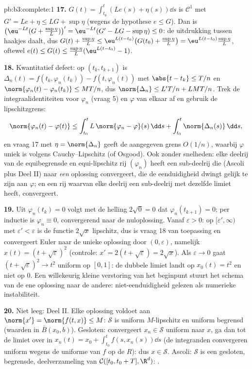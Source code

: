 \begin{solution}{pb:b3:complete:1}
\textbf{17.} $G(t) = \int_{t_0}^t(Le(s) + \eta(s))\dd s$ is
$\mathcal C^1$ met $G' = Le + \eta \leq LG + \sup\eta$ (wegens de
hypothese $e \leq G$). Dan is $\bigl(\eu^{-Lt}(G +
\tfrac{\sup\eta}L)\bigr)' = \eu^{-Lt}(G' - LG - \sup\eta) \leq 0$:
de uitdrukking tussen haakjes daalt, dus $G(t) + \frac{\sup\eta}L
\leq \eu^{L(t - t_0)}\bigl(G(t_0) + \frac{\sup\eta}L\bigr) =
\eu^{L(t-t_0)}\frac{\sup\eta}L$, oftewel $e(t) \leq G(t) \leq
\frac{\sup\eta}L(\eu^{L(t-t_0)} - 1)$.

\textbf{18.} Kwantitatief defect: op $(t_k, t_{k+1})$ is
$\Delta_n(t) = f(t_k, \varphi_n(t_k)) - f(t, \varphi_n(t))$ met
$\abs{t - t_k} \leq T/n$ en $\norm{\varphi_n(t) -
\varphi_n(t_k)} \leq MT/n$, dus $\norm{\Delta_n} \leq L'T/n +
LMT/n$. Trek de integraalidentiteiten voor $\varphi_n$ (vraag 5)
en $\varphi$ van elkaar af en gebruik de lipschitzgrens:
\[
\norm{\varphi_n(t) - \varphi(t)} \leq
\int_{t_0}^t L\,\norm{\varphi_n - \varphi}(s)\,\dd s +
\int_{t_0}^t\norm{\Delta_n(s)}\,\dd s,
\]
en vraag 17 met $\eta = \norm{\Delta_n}$ geeft de aangegeven
grens $O(1/n)$, waarbij $\varphi$ uniek is volgens
Cauchy--Lipschitz (of Osgood). Ook zonder snelheden: elke deelrij
van de equibegrensde en equi-lipschitz rij $(\varphi_n)$ heeft een
sub-deelrij die (Ascoli plus Deel II) naar \emph{een} oplossing
convergeert, die de eenduidigheid dwingt gelijk te zijn aan
$\varphi$; en een rij waarvan elke deelrij een sub-deelrij met
dezelfde limiet heeft, convergeert.

\textbf{19.} Uit $\varphi_n(t_k) = 0$ volgt met de helling
$2\sqrt0 = 0$ dat $\varphi_n(t_{k+1}) = 0$; per inductie is
$\varphi_n \equiv 0$, convergerend naar de nuloplossing. Vanaf
$\varepsilon > 0$: op $[\varepsilon', \infty)$ met $\varepsilon' <
\varepsilon$ is de functie $2\sqrt x$ lipschitz, dus is vraag 18
van toepassing en convergeert Euler naar de unieke oplossing door
$(0, \varepsilon)$, namelijk $x(t) = (t + \sqrt\varepsilon)^2$
(controle: $x' = 2(t + \sqrt \varepsilon) = 2\sqrt x$). Als
$\varepsilon \to 0$ gaat $(t + \sqrt\varepsilon)^2 \to t^2$
uniform op $[0,1]$: de dubbele limiet landt op $x_0(t) = t^2$ en
niet op $0$. Een willekeurig kleine verstoring van het beginpunt
stuurt het schema van de ene oplossing naar de andere:
niet-eenduidigheid gelezen als numerieke instabiliteit.

\textbf{20.} Niet leeg: Deel II. Elke oplossing voldoet aan
$\norm{x'} = \norm{f(t, x)} \leq M$: $\mathcal S$ is uniform
$M$-lipschitz en uniform begrensd (waarden in $\bar B(x_0, b)$).
Gesloten: convergeert $x_n \in \mathcal S$ uniform naar $x$, ga
dan tot de limiet over in $x_n(t) = x_0 + \int_{t_0}^tf(s,
x_n(s))\dd s$ (de integranden convergeren uniform wegens de
uniforme  van $f$ op de  $R$): dus $x \in
\mathcal S$. Ascoli: $\mathcal S$ is een gesloten, begrensde,
 deelverzameling van $\mathcal C([t_0, t_0+T],
\R^d)$: .


\end{solution}
